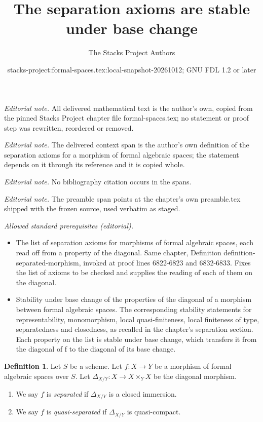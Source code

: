 \documentclass{stacks-project}
\title{The separation axioms are stable under base change}
\author{The Stacks Project Authors}
\date{stacks-project:formal-spaces.tex:local-snapshot-20261012; GNU FDL 1.2 or later}
\theoremstyle{plain}
\theoremstyle{definition}
\newtheorem{definition}[subsection]{Definition}
\theoremstyle{remark}
\numberwithin{equation}{subsection}
\begin{document}
\maketitle
\noindent\textit{Editorial note.} All delivered mathematical text is the author's own, copied from the pinned Stacks Project chapter file formal-spaces.tex; no statement or proof step was rewritten, reordered or removed.\par\medskip
\noindent\textit{Editorial note.} The delivered context span is the author's own definition of the separation axioms for a morphism of formal algebraic spaces; the statement depends on it through its reference and it is copied whole.\par\medskip
\noindent\textit{Editorial note.} No bibliography citation occurs in the spans.\par\medskip
\noindent\textit{Editorial note.} The preamble span points at the chapter's own preamble.tex shipped with the frozen source, used verbatim as staged.\par\medskip
\noindent\textit{Allowed standard prerequisites (editorial).}\begin{itemize}
\item The list of separation axioms for morphisms of formal algebraic spaces, each read off from a property of the diagonal. Same chapter, Definition definition-separated-morphism, invoked at proof lines 6822-6823 and 6832-6833. Fixes the list of axioms to be checked and supplies the reading of each of them on the diagonal.
\item Stability under base change of the properties of the diagonal of a morphism between formal algebraic spaces. The corresponding stability statements for representability, monomorphism, local quasi-finiteness, local finiteness of type, separatedness and closedness, as recalled in the chapter's separation section. Each property on the list is stable under base change, which transfers it from the diagonal of f to the diagonal of its base change.
\end{itemize}\medskip
\begin{definition}
\label{definition-separated-morphism}
Let $S$ be a scheme.
Let $f : X \to Y$ be a morphism of formal algebraic spaces over $S$.
Let $\Delta_{X/Y} : X \to X \times_Y X$ be the diagonal morphism.
\begin{enumerate}
\item We say $f$ is {\it separated} if $\Delta_{X/Y}$ is a closed immersion.
\item We say $f$ is {\it quasi-separated} if $\Delta_{X/Y}$ is quasi-compact.
\end{enumerate}
\end{definition}
\end{document}
